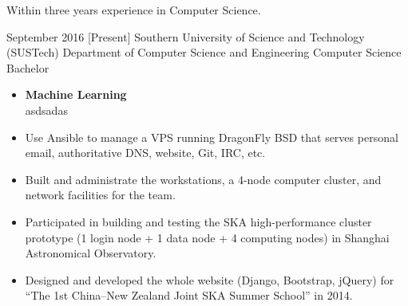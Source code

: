 \documentclass{resume}
\begin{document}
\makeheader

Within three years experience in Computer Science.

\begin{educations}
  \education%
    {September 2016}%
    [Present]%
    {Southern University of Science and Technology (SUSTech)}%
    {Department of Computer Science and Engineering}%
    {Computer Science}%
    {Bachelor}

\end{educations}

\begin{itemize}
  \item \textbf{Machine Learning}\\
  	asdsadas
  \item Use Ansible to manage a VPS running DragonFly BSD that serves
    personal email, authoritative DNS, website, Git, IRC, etc.
  \item Built and administrate the workstations, a 4-node computer cluster,
    and network facilities for the team.
  \item Participated in building and testing the SKA high-performance
    cluster prototype (1 login node + 1 data node + 4 computing nodes)
    in Shanghai Astronomical Observatory.
  \item Designed and developed the whole website (Django, Bootstrap, jQuery)
    for \enquote{The 1st China--New Zealand Joint SKA Summer School}
    in 2014.
    
\end{itemize}
\end{document}
